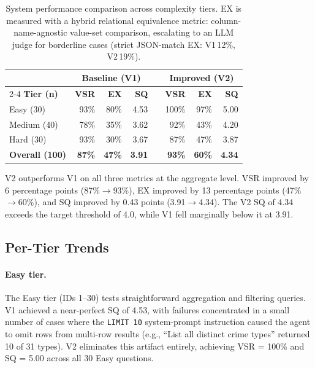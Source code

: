 \documentclass{article}
\begin{document}
\begin{table}[h]
\centering
\caption{System performance comparison across complexity tiers. EX is measured with a hybrid relational equivalence metric: column-name-agnostic value-set comparison, escalating to an LLM judge for borderline cases (strict JSON-match EX: V1\,12\%, V2\,19\%).}
\label{tab:main_results}
\begin{tabular}{lrrrrrrr}
\toprule
 & \multicolumn{3}{c}{\textbf{Baseline (V1)}} & & \multicolumn{3}{c}{\textbf{Improved (V2)}} \\
\cmidrule{2-4} \cmidrule{6-8}
\textbf{Tier (n)} & \textbf{VSR} & \textbf{EX} & \textbf{SQ} & &
                    \textbf{VSR} & \textbf{EX} & \textbf{SQ} \\
\midrule
Easy   (30) & 93\% & 80\% & 4.53 & & 100\% & 97\% & 5.00 \\
Medium (40) & 78\% & 35\% & 3.62 & &  92\% & 43\% & 4.20 \\
Hard   (30) & 93\% & 30\% & 3.67 & &  87\% & 47\% & 3.87 \\
\midrule
\textbf{Overall (100)} & \textbf{87\%} & \textbf{47\%} & \textbf{3.91} & &
                        \textbf{93\%} & \textbf{60\%} & \textbf{4.34} \\
\bottomrule
\end{tabular}
\end{table}

V2 outperforms V1 on all three metrics at the aggregate level. VSR improved by 6 percentage points (87\%$\rightarrow$93\%), EX improved by 13 percentage points (47\%$\rightarrow$60\%), and SQ improved by 0.43 points (3.91$\rightarrow$4.34). The V2 SQ of 4.34 exceeds the target threshold of 4.0, while V1 fell marginally below it at 3.91.

\subsection{Per-Tier Trends}

\paragraph{Easy tier.}
The Easy tier (IDs 1--30) tests straightforward aggregation and filtering queries. V1 achieved a near-perfect SQ of 4.53, with failures concentrated in a small number of cases where the \texttt{LIMIT 10} system-prompt instruction caused the agent to omit rows from multi-row results (e.g., ``List all distinct crime types'' returned 10 of 31 types). V2 eliminates this artifact entirely, achieving VSR = 100\% and SQ = 5.00 across all 30 Easy questions.
\end{document}
